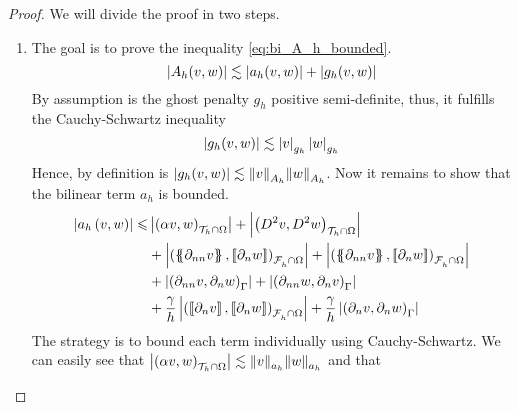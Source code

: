 \begin{proof}
    We will divide the proof in two steps.
    \begin{enumerate}[label=\arabic*)]
        \item The goal is to prove the inequality \eqref{eq:bi_A_h_bounded}. \[
                \left\lvert  A_{h}( v ,w )  \right\rvert \lesssim   \left\lvert a_{h}( v, w)  \right\rvert   + \left\lvert g_{h}( v,w)   \right\rvert          \]
                By assumption is the ghost penalty $g_{h}$ positive semi-definite, thus, it fulfills the Cauchy-Schwartz inequality \[
                \left\lvert  g_{h}(v,w )  \right\rvert \lesssim \left\lvert  v  \right\rvert _{g_{h}}\left\lvert  w  \right\rvert_{g_{h}}
                \]
                Hence, by definition is $\left\lvert  g_{h}(v,w )  \right\rvert \lesssim \| v \|_{ A_{h} }^{  } \| w \|_{ A_{h} }^{  } $. Now it remains to show that the bilinear term $ a_{h}$ is bounded.
                \begin{equation}
                    \begin{split}
                        \abs{ a_{h} \left( v, w \right) }   \le  &   \abs{\left( \alpha  v, w \right) _{\mathcal{T} _{h} \cap \Omega }  }    +  \abs{\left( D^2 v, D^2w \right) _{\mathcal{T} _{h} \cap \Omega}  }  \\
                                                     & + \abs{\left( \mean{  \partial _{n n} v }, \jump{ \partial _{n }w} \right)_{\mathcal{F}_{h}^{} \cap \Omega}  }   +
                                                     \abs{\left( \mean{ \partial _{nn } v }, \jump{ \partial _{n}w }      \right)_{\mathcal{F}_{h}^{} \cap \Omega}  } \\
                                                     & + \abs{\left(  \partial _{n n} v ,  \partial _{n }w \right)_{\Gamma }}     +
                                                     \abs{\left(  \partial _{n n} w ,  \partial _{n}v       \right)_{\Gamma }  }
                                                     \\
                                                     & + \frac{\gamma }{h} \abs{ \left( \jump{ \partial _{n} v}, \jump{ \partial _{n} w   }   \right)_{\mathcal{F}_{h}^{} \cap \Omega}  } + \frac{\gamma }{h} \abs{ \left(  \partial _{n} v,  \partial _{n} w
                                                     \right)_{\Gamma }  }
                    \end{split}
                \end{equation}
                The strategy is to bound each term individually using Cauchy-Schwartz. We can easily see that $\left\lvert \left( \alpha  v, w \right) _{\mathcal{T} _{h} \cap \Omega }   \right\rvert   \lesssim \| v \|_{a_{h}  }^{  } \| w \|_{ a_{h} }^{  } $ and that

\end{enumerate}
\end{proof}
